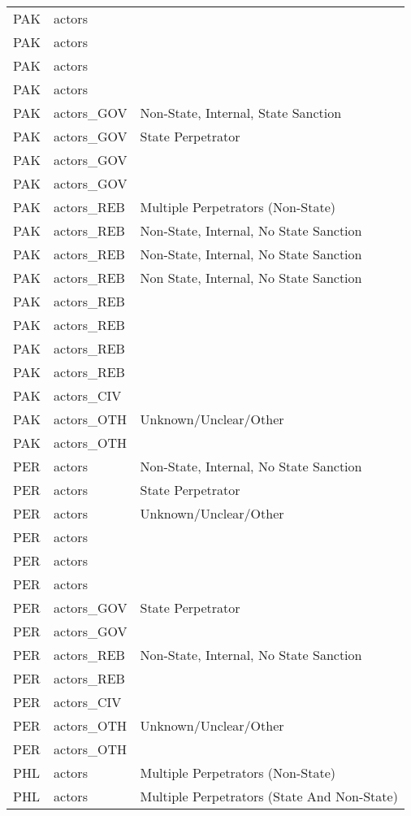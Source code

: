 \begin{table}[ht]
\begin{tabular}{lll}
  PAK & actors &  \\ 
  PAK & actors &  \\ 
  PAK & actors &  \\ 
  PAK & actors &  \\ 
  PAK & actors\_GOV & Non-State, Internal, State Sanction \\ 
  PAK & actors\_GOV & State Perpetrator \\ 
  PAK & actors\_GOV &  \\ 
  PAK & actors\_GOV &  \\ 
  PAK & actors\_REB & Multiple Perpetrators (Non-State) \\ 
  PAK & actors\_REB & Non-State, Internal, No State Sanction \\ 
  PAK & actors\_REB & Non-State, Internal, No State Sanction \\ 
  PAK & actors\_REB & Non State, Internal, No State Sanction \\ 
  PAK & actors\_REB &  \\ 
  PAK & actors\_REB &  \\ 
  PAK & actors\_REB &  \\ 
  PAK & actors\_REB &  \\ 
  PAK & actors\_CIV &  \\ 
  PAK & actors\_OTH & Unknown/Unclear/Other \\ 
  PAK & actors\_OTH &  \\ 
  PER & actors & Non-State, Internal, No State Sanction \\ 
  PER & actors & State Perpetrator \\ 
  PER & actors & Unknown/Unclear/Other \\ 
  PER & actors &  \\ 
  PER & actors &  \\ 
  PER & actors &  \\ 
  PER & actors\_GOV & State Perpetrator \\ 
  PER & actors\_GOV &  \\ 
  PER & actors\_REB & Non-State, Internal, No State Sanction \\ 
  PER & actors\_REB &  \\ 
  PER & actors\_CIV &  \\ 
  PER & actors\_OTH & Unknown/Unclear/Other \\ 
  PER & actors\_OTH &  \\ 
  PHL & actors & Multiple Perpetrators (Non-State) \\ 
  PHL & actors & Multiple Perpetrators (State And Non-State) \\ 

\end{tabular}
\end{table}
